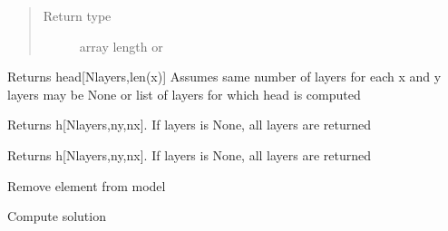 \documentclass[letterpaper,10pt,english]{sphinxmanual}
\begin{document}
\begin{fulllineitems}
\begin{fulllineitems}
\begin{quote}
\begin{description}
\item[{Return type}] \leavevmode
array length  or 

\end{description}\end{quote}

\end{fulllineitems}


\begin{fulllineitems}
\label{\detokenize{models/model:timml.model.Model.headalongline}}
Returns head{[}Nlayers,len(x){]}
Assumes same number of layers for each x and y
layers may be None or list of layers for which head is computed

\end{fulllineitems}


\begin{fulllineitems}
\label{\detokenize{models/model:timml.model.Model.headgrid}}
Returns h{[}Nlayers,ny,nx{]}.
If layers is None, all layers are returned

\end{fulllineitems}


\begin{fulllineitems}
\label{\detokenize{models/model:timml.model.Model.headgrid2}}
Returns h{[}Nlayers,ny,nx{]}. If layers is None, all layers are returned

\end{fulllineitems}


\begin{fulllineitems}
\label{\detokenize{models/model:timml.model.Model.remove_element}}
Remove element  from model

\end{fulllineitems}


\begin{fulllineitems}
\label{\detokenize{models/model:timml.model.Model.solve}}
Compute solution

\end{fulllineitems}


\end{fulllineitems}
\end{document}
